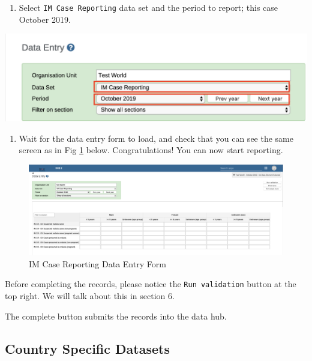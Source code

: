 \documentclass[]{book}
\providecommand{\tightlist}{%
  \setlength{\itemsep}{0pt}\setlength{\parskip}{0pt}}
\begin{document}
\begin{enumerate}
\def\labelenumi{\arabic{enumi}.}
\setcounter{enumi}{3}
\tightlist
\item
  Select \texttt{IM\ Case\ Reporting} data set and the period to report; this case October 2019.
\end{enumerate}

\includegraphics[width=17.36in]{./images/im-reporting}

\begin{enumerate}
\def\labelenumi{\arabic{enumi}.}
\setcounter{enumi}{4}
\tightlist
\item
  Wait for the data entry form to load, and check that you can see the same screen as in Fig \ref{fig:data-entry} below. Congratulations! You can now start reporting.
\end{enumerate}

\begin{figure}
\includegraphics[width=46.42in]{./images/data-entry} \caption{IM Case Reporting Data Entry Form}\label{fig:data-entry}
\end{figure}

Before completing the records, please notice the \texttt{Run\ validation} button at the top right. We will talk about this in section 6.

The complete button submits the records into the data hub.

\hypertarget{country-dataset}{%
\subsection{Country Specific Datasets}\label{country-dataset}}
\end{document}
